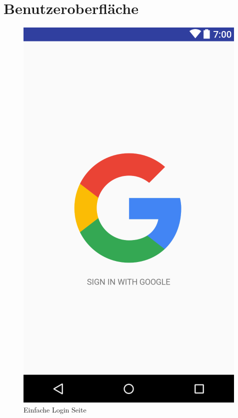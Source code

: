 \documentclass[parskip=full]{scrartcl}
\begin{document}
\newpage
\section{Benutzeroberfläche}
\begin{figure}[H]
	\centering
	\includegraphics[width=.7\textwidth]{GUI/AndroidStudio/login_simple.PNG}
	\caption{Einfache Login Seite}	
\end{figure}
\end{document}
